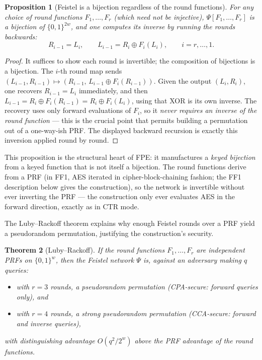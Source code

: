 \documentclass[11pt,a4paper]{article}
\newtheorem{theorem}{Theorem}[section]
\newtheorem{proposition}[theorem]{Proposition}
\theoremstyle{definition}
\theoremstyle{remark}
\begin{document}
\begin{proposition}[Feistel is a bijection regardless of the round functions]\label{prf:prp:feistelbijection}
For any choice of round functions \(F_1, \dots, F_r\) (which need not be injective), \(\Psi[F_1,\dots,F_r]\) is a bijection of \(\{0,1\}^{2w}\), and one computes its inverse by running the rounds backwards:
\[
  R_{i-1} = L_i, \qquad L_{i-1} = R_i \oplus F_i(L_i), \qquad i = r, \dots, 1.
\]
\end{proposition}

\begin{proof}
It suffices to show each round is invertible; the composition of bijections is a bijection. The \(i\)-th round map sends \((L_{i-1}, R_{i-1}) \mapsto (R_{i-1},\, L_{i-1} \oplus F_i(R_{i-1}))\). Given the output \((L_i, R_i)\), one recovers \(R_{i-1} = L_i\) immediately, and then \(L_{i-1} = R_i \oplus F_i(R_{i-1}) = R_i \oplus F_i(L_i)\), using that XOR is its own inverse. The recovery uses only forward evaluations of \(F_i\), so it \emph{never requires an inverse of the round function} --- this is the crucial point that permits building a permutation out of a one-way-ish PRF. The displayed backward recursion is exactly this inversion applied round by round.
\end{proof}

This proposition is the structural heart of FPE: it manufactures a \emph{keyed bijection} from a keyed function that is not itself a bijection. The round functions derive from a PRF (in FF1, AES iterated in cipher-block-chaining fashion; the FF1 description below gives the construction), so the network is invertible without ever inverting the PRF --- the construction only ever evaluates AES in the forward direction, exactly as in CTR mode.

The Luby--Rackoff theorem explains why enough Feistel rounds over a PRF yield a pseudorandom permutation, justifying the construction's security.

\begin{theorem}[Luby--Rackoff]\label{prf:thm:lubyrackoff}
If the round functions \(F_1, \dots, F_r\) are independent PRFs on \(\{0,1\}^{w}\), then the Feistel network \(\Psi\) is, against an adversary making \(q\) queries:
\begin{itemize}
\item with \(r = 3\) rounds, a pseudorandom permutation (CPA-secure: forward queries only), and
\item with \(r = 4\) rounds, a \emph{strong} pseudorandom permutation (CCA-secure: forward and inverse queries),
\end{itemize}
with distinguishing advantage \(O(q^{2}/2^{w})\) above the PRF advantage of the round functions.
\end{theorem}
\end{document}
